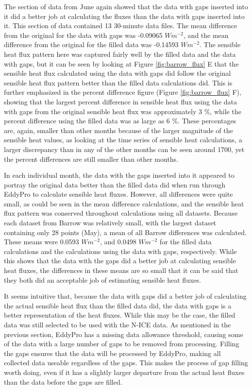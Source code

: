 The section of data from June again showed that the data with gaps inserted into it did a better job at calculating the fluxes than the data with gaps inserted into it. This section of data contained 13 30-minute data files. The mean difference from the original for the data with gaps was -0.09065 $Wm^{-2}$, and the mean difference from the original for the filled data was -0.14593 $Wm^{-2}$. The sensible heat flux pattern here was captured fairly well by the filled data and the data with gaps, but it can be seen by looking at Figure \ref{fig:barrow_flux} E that the sensible heat flux calculated using the data with gaps did follow the original sensible heat flux pattern better than the filled data calculations did. This is further emphasized in the percent difference figure (Figure \ref{fig:barrow_flux} F), showing that the largest percent difference in sensible heat flux using the data with gaps from the original sensible heat flux was approximately 3 $\%$, while the percent difference using the filled data was as large as 6 $\%$. These percentages are, again, smaller than other months because of the larger magnitude of the sensible heat values, as looking at the time series of sensible heat calculations, a larger discrepancy than in any of the other months can be seen around 1700, yet the percent differences are still smaller than other months.

In each individual month, the data with the gaps inserted into it appeared to portray the original data better than the filled data did when run through EddyPro to calculate sensible heat fluxes. However, all differences were quite small, as could be seen in the mean difference calculations, and the sensible heat flux pattern was conserved throughout calculations using all datasets. Because each dataset from Barrow was relatively small, with the largest dataset containing only 28 points (May), a mean of all Barrow differences was calculated. These means were 0.0593 $Wm^{-2}$, and 0.0498 $Wm^{-2}$ for the filled data calculations and the calculations using the data with gaps, respectively. While this shows that the data with the gaps did a better job at calculating sensible heat fluxes, the differences in these means are so small that it can be said that they both did an acceptable job of estimating sensible heat fluxes. 

It seems intuitive that, because the data with gaps did a better job of calculating the actual sensible heat flux than the filled data did, the data with gaps is a better representation of the heat fluxes. While this may be the case, the filled data was still selected to be used with the N-ICE data. As mentioned in the previous section, EddyPro has a missing data allowance threshold, causing some of the data with a large number of gaps to be removed from processing. Filling the gaps ensures that the data will be processed by EddyPro, making all collected data useable regardless of the gaps. This makes the process of gap filling worth doing, even if it has a slightly larger departure from the actual heat fluxes than the data before the gaps are filled. 

